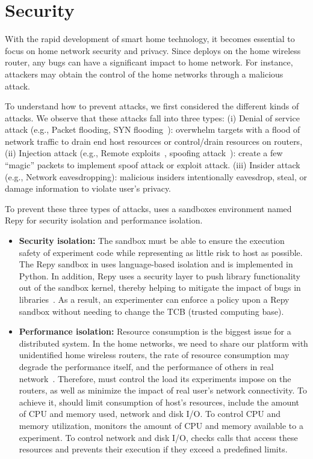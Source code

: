 \section{Security}
\label{sec.security}
With the rapid development of smart home technology, it becomes essential to focus on home network security and privacy. Since \sysname deploys on the home wireless router, any bugs can have a significant impact to home network. For instance, attackers may obtain the control of the home networks through a malicious attack. 

To understand how to prevent attacks, we first considered the different kinds of attacks. We observe that these attacks fall into three types: (i) Denial of service attack (e.g., Packet flooding, SYN flooding~\cite{eddy2011syn}): overwhelm targets with a flood of network traffic to drain end host resources or control/drain resources on routers, (ii) Injection attack (e.g., Remote exploits~\cite{shellcode},  spoofing attack~\cite{bishop1996attack}): create a few ``magic'' packets to implement spoof attack or exploit attack. (iii) Insider attack (e.g., Network eavesdropping): malicious insiders intentionally eavesdrop, steal, or damage information to violate user's privacy.

To prevent these three types of attacks, \sysname uses a sandboxes environment named Repy for security isolation and performance isolation.
 
\begin{itemize} 
\item \textbf{Security isolation:} The sandbox must be able to ensure the execution safety of experiment code while representing as little risk to host as possible. The Repy sandbox in \sysname uses language-based isolation and is implemented in Python. In addition, Repy uses a security layer to push library functionality out of the sandbox kernel, thereby helping to mitigate the impact of bugs in libraries~\cite{cappos2010retaining}. As a result, an experimenter can enforce a policy upon a Repy sandbox without needing to change the TCB (trusted computing base).  
\item \textbf{Performance isolation:} Resource consumption is the biggest issue for a distributed system. In the home networks, we need to share our platform with unidentified home wireless routers, the rate of resource consumption may degrade the performance itself, and the performance of others in real network~\cite{joshi2013survey}. Therefore, \sysname must control the load its experiments impose on the routers, as well as minimize the impact of real user's network connectivity. To achieve it, \sysname should limit consumption of host's resources, include the amount of CPU and memory used, network and disk I/O. To control CPU and memory utilization, \sysname monitors the amount of CPU and memory available to a experiment. To control network and disk I/O, \sysname checks calls that access these resources and prevents their execution if they exceed a predefined limits. 
\end{itemize}

